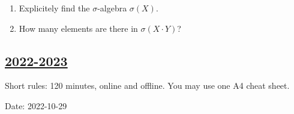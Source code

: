 \begin{enumerate}
    \begin{enumerate}
     \item Explicitely find the $\sigma$-algebra $\sigma(X)$.
     \item How many elements are there in $\sigma(X \cdot Y)$?
    \end{enumerate}
    
\end{enumerate}


\subsection[2022-2023]{\hyperref[sec:sol_kr_01_2022_2023]{2022-2023}}
\label{sec:kr_01_2022_2023} %

Short rules: 120 minutes, online and offline. You may use one A4 cheat sheet.

Date: 2022-10-29


